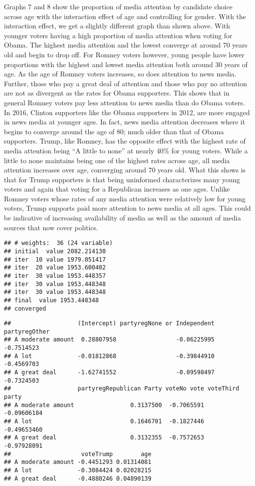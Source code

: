 \documentclass[11pt,]{article}
\begin{document}
Graphs 7 and 8 show the proportion of media attention by candidate
choice across age with the interaction effect of age and controlling for
gender. With the interaction effect, we get a slightly different graph
than shown above. With younger voters having a high proportion of media
attention when voting for Obama. The highest media attention and the
lowest converge at around 70 years old and begin to drop off. For Romney
voters however, young people have lower proportions with the highest and
lowest media attention both around 30 years of age. As the age of Romney
voters increases, so does attention to news media. Further, those who
pay a great deal of attention and those who pay no attention are not as
divergent as the rates for Obama supporters. This shows that in general
Romney voters pay less attention to news media than do Obama voters. In
2016, Clinton supporters like the Obama supporters in 2012, are more
engaged in news media at younger ages. In fact, news media attention
decreases where it begins to converge around the age of 80; much older
than that of Obama supporters. Trump, like Romney, has the opposite
effect with the highest rate of media attention being ``A little to
none'' at nearly 40\% for young voters. While a little to none maintains
being one of the highest rates across age, all media attention increases
over age, converging around 70 years old. What this shows is that for
Trump supporters is that being uninformed characterizes many young
voters and again that voting for a Republican increases as one ages.
Unlike Romney voters whose rates of any media attention were relatively
low for young voters, Trump supports paid more attention to news media
at all ages. This could be indicative of increasing availability of
media as well as the amount of media sources that now cover politics.

\begin{verbatim}
## # weights:  36 (24 variable)
## initial  value 2082.214130 
## iter  10 value 1979.051417
## iter  20 value 1953.600402
## iter  30 value 1953.448357
## iter  30 value 1953.448348
## iter  30 value 1953.448348
## final  value 1953.448348 
## converged
\end{verbatim}

\begin{verbatim}
##                   (Intercept) partyregNone or Independent partyregOther
## A moderate amount  0.28807958                 -0.06225995    -0.7514523
## A lot             -0.01812868                 -0.39844910    -0.4569703
## A great deal      -1.62741552                 -0.09598497    -0.7324503
##                   partyregRepublican Party voteNo vote voteThird party
## A moderate amount                0.3137500  -0.7065591     -0.09606184
## A lot                            0.1646701  -0.1827446     -0.49653460
## A great deal                     0.3132355  -0.7572653     -0.97928091
##                    voteTrump        age
## A moderate amount -0.4451293 0.01314081
## A lot             -0.3084424 0.02028215
## A great deal      -0.4880246 0.04890139
\end{verbatim}
\end{document}
